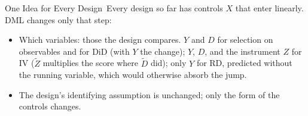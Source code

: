 \documentclass[aspectratio=169,11pt,xcolor=dvipsnames]{beamer}
\newcommand{\core}{\,\raisebox{0.6pt}{\textcolor{corestar}{$\bigstar$}}}
\begin{document}
\begin{frame}{One Idea for Every Design\core}
Every design so far has controls $X$ that enter linearly. DML changes only that step:
\begin{center}
\end{center}
\begin{itemize}\itemsep2pt
  \item Which variables: those the design compares. $Y$ and $D$ for selection on observables and
        for DiD (with $Y$ the change); $Y$, $D$, and the instrument $Z$ for IV ($\tilde Z$ multiplies the
        score where $\tilde D$ did); only $Y$ for RD, predicted without the running variable, which
        would otherwise absorb the jump.
  \item The design's identifying assumption is unchanged; only the form of the controls changes.
\end{itemize}
\end{frame}
\end{document}
